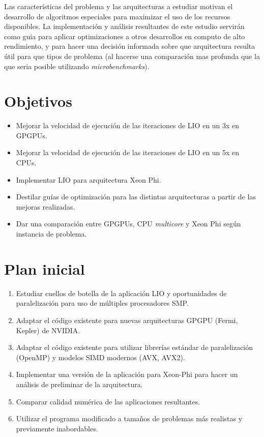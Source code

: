 \documentclass[a4paper, 12pt]{article}
\begin{document}
Las caracter\'isticas del problema y las arquitecturas a estudiar motivan el desarrollo de algoritmos especiales para maximizar el uso de los
recursos disponibles. La implementaci\'on y an\'alisis resultantes de este estudio servir\'an como guia para aplicar optimizaciones a otros
desarrollos en computo de alto rendimiento, y para hacer una decisi\'on informada sobre que arquitectura resulta \'util para que tipos de problema
(al hacerse una comparaci\'on mas profunda que la que seria posible utilizando \textit{microbenchmarks}).

\section*{Objetivos}

\begin{itemize}
\item Mejorar la velocidad de ejecuci\'on de las iteraciones de LIO en un 3x en GPGPUs.

\item Mejorar la velocidad de ejecuci\'on de las iteraciones de LIO en un 5x en CPUs.

\item Implementar LIO para arquitectura Xeon Phi.

\item Destilar gu\'ias de optimizaci\'on para las distintas arquitecturas a partir de las mejoras realizadas.

\item Dar una comparaci\'on entre GPGPUs, CPU \textit{multicore} y Xeon Phi seg\'un instancia de problema.
\end{itemize}

\section*{Plan inicial}

\begin{enumerate}

\item Estudiar cuellos de botella de la aplicaci\'on LIO y oportunidades de paralelizaci\'on para uso de m\'ultiples procesadores SMP.

\item Adaptar el c\'odigo existente para nuevas arquitecturas GPGPU (Fermi, Kepler) de NVIDIA.

\item Adaptar el c\'odigo existente para utilizar librer\'ias est\'andar de paralelizaci\'on (OpenMP) y modelos SIMD modernos (AVX, AVX2).

\item Implementar una versi\'on de la aplicaci\'on para Xeon-Phi para hacer un an\'alisis de preliminar de la arquitectura.

\item Comparar calidad num\'erica de las aplicaciones resultantes.

\item Utilizar el programa modificado a tama\~nos de problemas m\'as realistas y previamente inabordables.

\end{enumerate}
\end{document}
